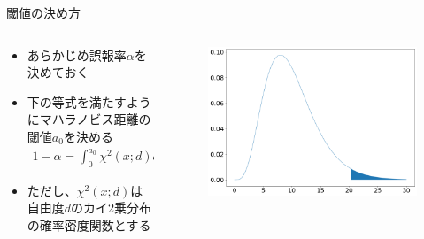 \documentclass[aspectratio=169,unicode,dvipdfmx,14pt]{beamer}
\begin{document}
\begin{frame}{閾値の決め方}
\begin{columns}[onlytextwidth]
\begin{column}{.6\textwidth}
\begin{itemize}
\item あらかじめ誤報率$\alpha$を決めておく
\item 下の等式を満たすようにマハラノビス距離の閾値$a_0$を決める
\begin{align}
1 - \alpha = \int_0^{a_0} \chi^2(x;d) dx
\end{align}
\item ただし、$\chi^2(x;d)$は自由度$d$のカイ2乗分布の確率密度関数とする
\end{itemize}
\end{column}
\begin{column}{.4\textwidth}
\begin{figure}[htbp]
\begin{center}
\includegraphics[scale=.25]{chi2_2.png}
\end{center}
\end{figure}
\end{column}
\end{columns}
\end{frame}
\end{document}
